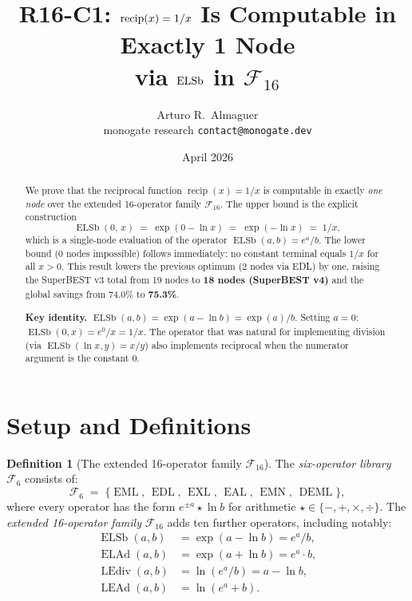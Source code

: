 \documentclass[12pt,a4paper]{article}
\title{R16-C1: $\recip(x) = 1/x$ Is Computable in Exactly 1 Node\\
       via $\ELSb$ in $\mathcal{F}_{16}$}
\author{Arturo R.\ Almaguer\\
\small monogate research \quad \texttt{contact@monogate.dev}}
\date{April 2026}
\theoremstyle{definition}
\newtheorem{definition}[theorem]{Definition}
\newcommand{\EML}{\operatorname{EML}}
\newcommand{\EDL}{\operatorname{EDL}}
\newcommand{\EXL}{\operatorname{EXL}}
\newcommand{\EAL}{\operatorname{EAL}}
\newcommand{\EMN}{\operatorname{EMN}}
\newcommand{\DEML}{\operatorname{DEML}}
\newcommand{\ELAd}{\operatorname{ELAd}}
\newcommand{\ELSb}{\operatorname{ELSb}}
\newcommand{\LEAd}{\operatorname{LEAd}}
\newcommand{\LEdiv}{\operatorname{LEdiv}}
\newcommand{\recip}{\operatorname{recip}}
\begin{document}
\maketitle

\begin{abstract}
We prove that the reciprocal function $\recip(x) = 1/x$ is computable
in exactly \emph{one node} over the extended 16-operator family
$\mathcal{F}_{16}$.
The upper bound is the explicit construction
\[
  \ELSb(0,\,x) \;=\; \exp(0 - \ln x) \;=\; \exp(-\ln x) \;=\; 1/x,
\]
which is a single-node evaluation of the operator $\ELSb(a,b) = e^a/b$.
The lower bound (0 nodes impossible) follows immediately: no constant
terminal equals $1/x$ for all $x > 0$.
This result lowers the previous optimum (2 nodes via EDL) by one, raising
the SuperBEST v3 total from 19 nodes to \textbf{18 nodes (SuperBEST v4)}
and the global savings from 74.0\% to \textbf{75.3\%}.

\medskip\noindent
\textbf{Key identity.}
$\ELSb(a,b) = \exp(a - \ln b) = \exp(a)/b$.
Setting $a = 0$: $\ELSb(0,x) = e^0/x = 1/x$.
The operator that was natural for implementing division (via
$\ELSb(\ln x, y) = x/y$) also implements reciprocal
when the numerator argument is the constant $0$.
\end{abstract}

\tableofcontents
\bigskip

\section{Setup and Definitions}

\begin{definition}[The extended 16-operator family $\mathcal{F}_{16}$]
\label{def:F16}
The \emph{six-operator library} $\mathcal{F}_6$ consists of:
\[
  \mathcal{F}_6 \;=\; \{\EML,\,\EDL,\,\EXL,\,\EAL,\,\EMN,\,\DEML\},
\]
where every operator has the form $e^{\pm a} \star \ln b$ for arithmetic
$\star \in \{-,+,\times,\div\}$.
The \emph{extended 16-operator family} $\mathcal{F}_{16}$ adds ten further
operators, including notably:
\begin{align*}
  \ELSb(a,b) &= \exp(a - \ln b) = e^a / b, \\
  \ELAd(a,b) &= \exp(a + \ln b) = e^a \cdot b, \\
  \LEdiv(a,b) &= \ln(e^a / b) = a - \ln b, \\
  \LEAd(a,b)  &= \ln(e^a + b).
\end{align*}
\end{definition}
\end{document}
